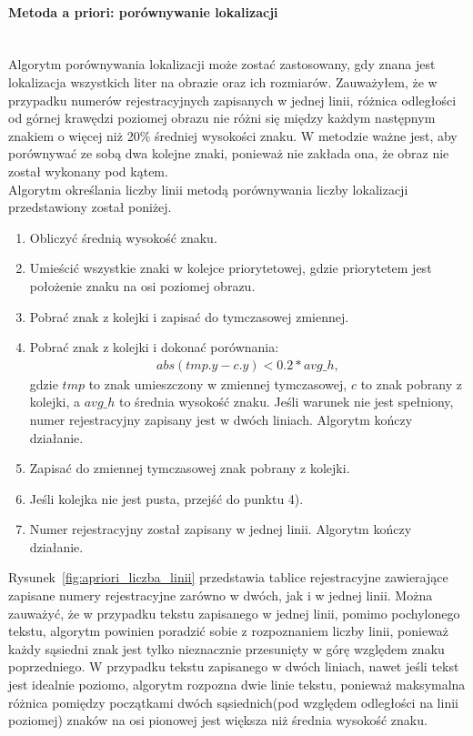 \paragraph{Metoda a priori: porównywanie lokalizacji}\mbox{}\\
Algorytm porównywania lokalizacji może zostać zastosowany, gdy znana jest lokalizacja wszystkich liter na obrazie oraz ich rozmiarów. Zauważyłem, że w przypadku numerów rejestracyjnych zapisanych w jednej linii, różnica odległości od górnej krawędzi poziomej obrazu nie różni się między każdym następnym znakiem o więcej niż 20\% średniej wysokości znaku. W metodzie ważne jest, aby porównywać ze sobą dwa kolejne znaki, ponieważ nie zakłada ona, że obraz nie został wykonany pod kątem.\\
Algorytm określania liczby linii metodą porównywania liczby lokalizacji przedstawiony został poniżej.
\begin{enumerate}
  \item Obliczyć średnią wysokość znaku.
  \item Umieścić wszystkie znaki w kolejce priorytetowej, gdzie priorytetem jest położenie znaku na osi poziomej obrazu.
  \item Pobrać znak z kolejki i zapisać do tymczasowej zmiennej.
  \item Pobrać znak z kolejki i dokonać porównania:
    \begin{gather*}
      abs(tmp.y - c.y) < 0.2*avg\_h,
    \end{gather*}
    gdzie $tmp$ to znak umieszczony w zmiennej tymczasowej, $c$ to znak pobrany z kolejki, a $avg\_h$ to średnia wysokość znaku. Jeśli warunek nie jest spełniony, numer rejestracyjny zapisany jest w dwóch liniach. Algorytm kończy działanie.
  \item Zapisać do zmiennej tymczasowej znak pobrany z kolejki.
  \item Jeśli kolejka nie jest pusta, przejść do punktu 4).
  \item Numer rejestracyjny został zapisany w jednej linii. Algorytm kończy działanie.
\end{enumerate}
Rysunek~\ref{fig:apriori_liczba_linii} przedstawia tablice rejestracyjne zawierające zapisane numery rejestracyjne zarówno w dwóch, jak i w jednej linii. Można zauważyć, że w przypadku tekstu zapisanego w jednej linii, pomimo pochylonego tekstu, algorytm powinien poradzić sobie z rozpoznaniem liczby linii, ponieważ każdy sąsiedni znak jest tylko nieznacznie przesunięty w górę względem znaku poprzedniego. W przypadku tekstu zapisanego w dwóch liniach, nawet jeśli tekst jest idealnie poziomo, algorytm rozpozna dwie linie tekstu, ponieważ maksymalna różnica pomiędzy początkami dwóch sąsiednich(pod względem odległości na linii poziomej) znaków na osi pionowej jest większa niż średnia wysokość znaku.

